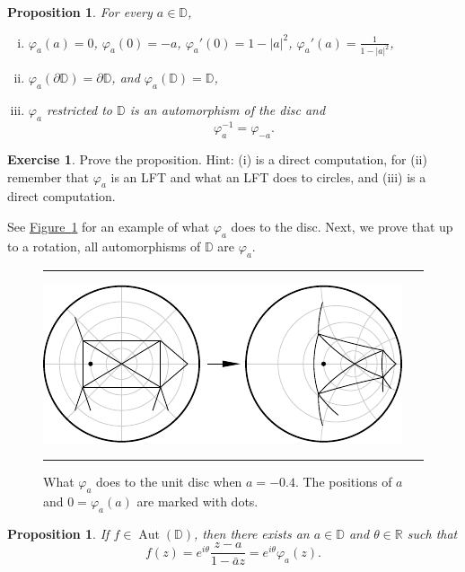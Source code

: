 \documentclass[12pt,openany]{book}
\newcommand{\Aut}{\operatorname{Aut}}
\newcommand{\sabs}[1]{\lvert {#1} \rvert}
\newcommand{\R}{{\mathbb{R}}}
\newcommand{\D}{{\mathbb{D}}}
\theoremstyle{plain}
\newtheorem{prop}[thm]{Proposition}
\theoremstyle{remark}
\theoremstyle{definition}
\newenvironment{exbox}{%
    \def\FrameCommand{\vrule width 1pt \relax\hspace{10pt}}%
    \MakeFramed{\advance\hsize-\width\FrameRestore}%
}{%
    \endMakeFramed
}
\newenvironment{myfig}{%
\begin{figure}[h!t]
\noindent\rule{\textwidth}{0.5pt}\vspace{12pt}\par\centering}%
{\par\noindent\rule{\textwidth}{0.5pt}
\end{figure}}
\theoremstyle{exercise}
\newtheorem{exercise}{Exercise}[section]
\theoremstyle{example}
\newcommand{\figureref}[1]{\hyperref[#1]{Figure~\ref*{#1}}}
\begin{document}
\begin{prop}
For every $a \in \D$,
\begin{enumerate}[(i)]
\item
$\varphi_a(a) = 0$, \enspace
$\varphi_a(0) = -a$, \enspace
$\varphi_a'(0) = 1 - \sabs{a}^2$, \enspace
$\varphi_a'(a) = \frac{1}{1 - \sabs{a}^2}$,
\item
$\varphi_a(\partial \D) = \partial \D$,
and
$\varphi_a(\D) = \D$,
\item
$\varphi_a$ restricted to $\D$ is an automorphism of the disc and
\begin{equation*}
\varphi_a^{-1} = \varphi_{-a} .
\end{equation*}
\end{enumerate}
\end{prop}

\begin{exbox}
\begin{exercise}
Prove the proposition.
Hint: (i) is a direct computation, for (ii)
remember that
$\varphi_a$ is an LFT and what an LFT does to circles,
and (iii) is a direct computation.
\end{exercise}
\end{exbox}

See \figureref{fig:varphiplot} for an example of what $\varphi_a$ does to the disc.
Next, we prove that up to a rotation, all automorphisms of $\D$ are
$\varphi_a$.
\begin{myfig}
\includegraphics{figures/varphiplot}
\caption{What $\varphi_a$ does to the unit disc when $a=-0.4$.   The positions of $a$ and $0=\varphi_a(a)$ are marked with dots.%
\label{fig:varphiplot}}
\end{myfig}

\begin{prop}
If $f \in \Aut(\D)$, then there exists an $a \in \D$
and $\theta \in \R$ such that
\begin{equation*}
f(z) = e^{i\theta} \frac{z-a}{1-\bar{a}z} = e^{i\theta} \varphi_a(z).
\end{equation*}
\end{prop}
\end{document}
